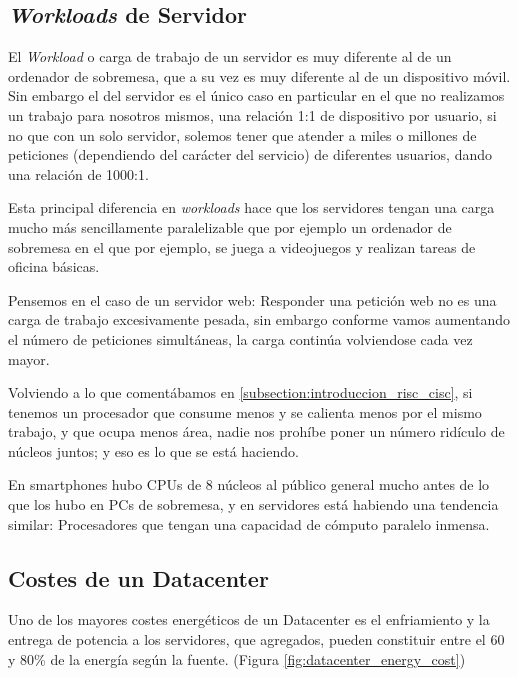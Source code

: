 \documentclass[a4paper,openright,12pt]{article}
\begin{document}
\subsection{\emph{Workloads} de Servidor}\label{subsection:workloads_servidor}
El \emph{Workload} o carga de trabajo de un servidor es muy diferente al de un ordenador de sobremesa, que a su vez es muy diferente al de un dispositivo móvil. Sin embargo el del servidor
es el único caso en particular en el que no realizamos un trabajo para nosotros mismos, una relación 1:1 de dispositivo por usuario, si no que con un solo servidor, solemos tener que atender
a miles o millones de peticiones (dependiendo del carácter del servicio) de diferentes usuarios, dando una relación de 1000:1.

Esta principal diferencia en \emph{workloads} hace que los servidores tengan una carga mucho más sencillamente paralelizable que por ejemplo un ordenador de sobremesa en el que por ejemplo,
se juega a videojuegos y realizan tareas de oficina básicas.

Pensemos en el caso de un servidor web: Responder una petición web no es una carga de trabajo excesivamente pesada, sin embargo conforme vamos aumentando el número de peticiones simultáneas,
la carga continúa volviendose cada vez mayor.

Volviendo a lo que comentábamos en \ref{subsection:introduccion_risc_cisc}, si tenemos un procesador que consume menos y se calienta menos por el mismo trabajo, y que ocupa menos área, nadie
nos prohíbe poner un número ridículo de núcleos juntos; y eso es lo que se está haciendo.

En smartphones hubo CPUs de 8 núcleos al público general mucho antes de lo que los hubo en PCs de sobremesa, y en servidores está habiendo una tendencia similar: Procesadores que tengan
una capacidad de cómputo paralelo inmensa. \parencite{ampere_announces_128_core_arm_server_cpu}

\subsection{Costes de un Datacenter}
Uno de los mayores costes energéticos de un Datacenter es el enfriamiento y la entrega de potencia a los servidores, que agregados, pueden constituir entre el 60 y 80\% de la energía según
la fuente. (Figura \ref{fig:datacenter_energy_cost})
\end{document}
